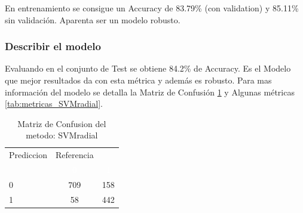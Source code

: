 En entrenamiento se consigue un Accuracy de 83.79\% (con validation) y
85.11\% sin validación. Aparenta ser un modelo robusto.


\subsubsection{Describir el modelo}

Evaluando en el conjunto de Test se obtiene 84.2\% de Accuracy. Es el Modelo que mejor resultados da con esta métrica y además es robusto. Para mas información del modelo se detalla la Matriz de Confusión \ref{tab:MatrizConf_SVMradial} y Algunas métricas \ref{tab:metricas_SVMradial}.

\begin{table}[!h]
	
	\caption{\label{tab:MatrizConf_SVMradial}Matriz de Confusion del metodo: SVMradial }
	\centering
	\begin{tabular}[t]{lcc}
		\toprule
		\multicolumn{1}{c}{Prediccion} & \multicolumn{1}{c}{Referencia} & \multicolumn{1}{c}{ } \\
		\cmidrule(l{3pt}r{3pt}){1-1} \cmidrule(l{3pt}r{3pt}){2-2}
		\rowcolor{black}  \multicolumn{1}{c}{\textcolor{white}{\textbf{ }}} & \multicolumn{1}{c}{\textcolor{white}{\textbf{0}}} & \multicolumn{1}{c}{\textcolor{white}{\textbf{1}}}\\
		\midrule
		\rowcolor{gray!6}  0 & 709 & 158\\
		1 & 58 & 442\\
		\bottomrule
	\end{tabular}
\end{table}

